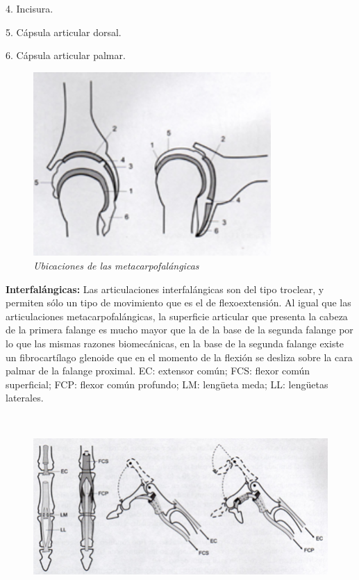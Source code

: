 \documentclass{article}
\begin{document}
4.	Incisura.

5.	Cápsula articular dorsal.

6.	Cápsula articular palmar.

\begin{figure}[H]
    \centering
    \includegraphics[height=7cm]{Imagenes/2.png}
    \caption{\textit{Ubicaciones de las metacarpofalángicas}} %
    \label{exemploLabel}
    \end{figure}
    
\textbf{Interfalángicas:} Las articulaciones interfalángicas son del tipo troclear, y permiten sólo un tipo de movimiento que es el de flexoextensión. Al igual que las articulaciones metacarpofalángicas, la superficie articular que presenta la cabeza de la primera falange es mucho mayor que la de la base de la segunda falange por lo que las mismas razones biomecánicas, en la base de la segunda falange existe un fibrocartílago glenoide que en el momento de la flexión se desliza sobre la cara palmar de la falange proximal. EC: extensor común; FCS: flexor común superficial; FCP: flexor común profundo; LM: lengüeta meda; LL: lengüetas laterales.
\begin{figure}[H]
    \centering
    \includegraphics[height=7cm]{Imagenes/3.png}
    \caption{\textit{}} %
    \label{exemploLabel}
    \end{figure}
\end{document}
